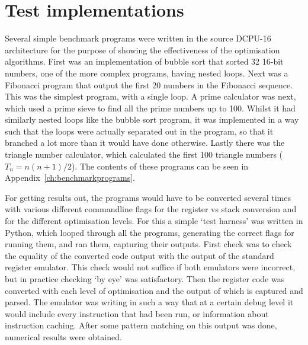 \section{Test implementations}
Several simple benchmark programs were written in the source DCPU-16
architecture for the purpose of showing the effectiveness of the optimisation
algorithms. First was an implementation of bubble sort that sorted 32 16-bit
numbers, one of the more complex programs, having nested loops. Next was a
Fibonacci program that output the first 20 numbers in the Fibonacci sequence.
This was the simplest program, with a single loop. A prime calculator was next,
which used a prime sieve to find all the prime numbers up to 100. Whilst it had
similarly nested loops like the bubble sort program, it was implemented in a way
such that the loops were actually separated out in the program, so that it
branched a lot more than it would have done otherwise. Lastly there was the
triangle number calculator, which calculated the first 100 triangle numbers
($T_{n} = n(n+1)/2$). The contents of these programs can be seen in
Appendix~\ref{ch:benchmarkprograms}.

For getting results out, the programs would have to be converted several times
with various different commandline flags for the register vs stack conversion
and for the different optimisation levels. For this a simple `test harness' was
written in Python, which looped through all the programs, generating the correct
flags for running them, and ran them, capturing their outputs. First check was
to check the equality of the converted code output with the output of the
standard register emulator. This check would not suffice if both emulators were
incorrect, but in practice checking `by eye' was satisfactory. Then the register
code was converted with each level of optimisation and the output of which is
captured and parsed. The emulator was writing in such a way that at a certain
debug level it would include every instruction that had been run, or information
about instruction caching. After some pattern matching on this output was done,
numerical results were obtained.

